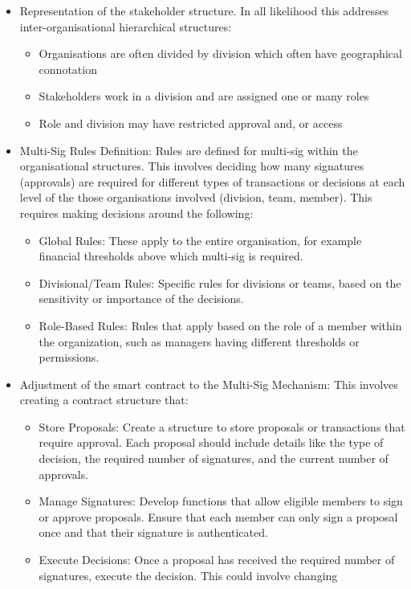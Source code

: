 \documentclass{tufte-handout}
\begin{document}
\begin{itemize}
    \item Representation of the stakeholder structure. In all likelihood this addresses inter-organisational hierarchical structures:
    \begin{itemize}
        \item Organisations are often divided by division which often have geographical connotation
        \item Stakeholders work in a division and are assigned one or many roles
        \item Role and division may have restricted approval and, or access
    \end{itemize}
    \item Multi-Sig Rules Definition: Rules are defined for multi-sig within the organisational structures. This involves deciding how many
    signatures (approvals) are required for different types of transactions or decisions at each level of the those organisations involved (division, team,
    member). This requires making decisions around the following:
    \begin{itemize}
        \item Global Rules: These apply to the entire organisation, for example financial thresholds above which multi-sig is required.
        \item Divisional/Team Rules: Specific rules for divisions or teams, based on the sensitivity or importance of the decisions.
        \item Role-Based Rules: Rules that apply based on the role of a member within the organization, such as managers having different thresholds
        or permissions.
    \end{itemize}
    \item Adjustment of the smart contract to the Multi-Sig Mechanism: This involves creating a contract structure that:
    \begin{itemize}
        \item Store Proposals: Create a structure to store proposals or transactions that require approval. Each proposal should include details
        like the type of decision, the required number of signatures, and the current number of approvals.
        \item Manage Signatures: Develop functions that allow eligible members to sign or approve proposals. Ensure that each member can only sign
        a proposal once and that their signature is authenticated.
        \item Execute Decisions: Once a proposal has received the required number of signatures, execute the decision. This could involve changing

\end{itemize}
\end{itemize}
\end{document}
